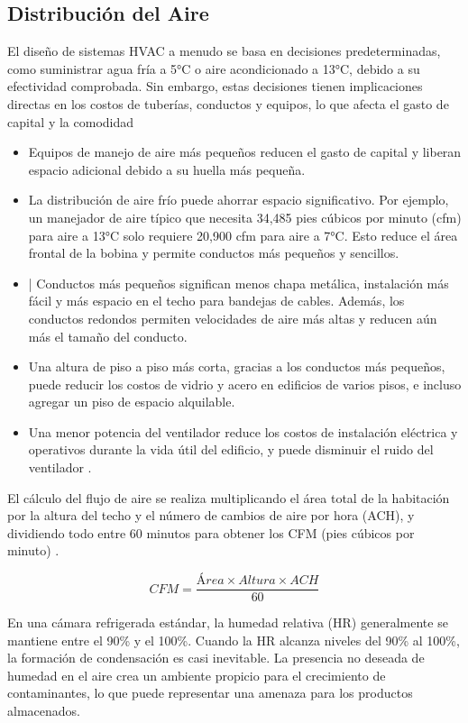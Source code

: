 \subsection{Distribución del Aire}
El diseño de sistemas HVAC a menudo se basa en decisiones predeterminadas, como suministrar agua fría a 5°C o aire acondicionado a 13°C, debido a su efectividad comprobada. Sin embargo, estas decisiones tienen implicaciones directas en los costos de tuberías, conductos y equipos, lo que afecta el gasto de capital y la comodidad \cite{hvac-2016}
\begin{itemize}
	\item Equipos de manejo de aire más pequeños reducen el gasto de capital y liberan espacio adicional debido a su huella más pequeña.
\item La distribución de aire frío puede ahorrar espacio significativo. Por ejemplo, un manejador de aire típico que necesita 34,485 pies cúbicos por minuto (cfm) para aire a 13°C solo requiere 20,900 cfm para aire a 7°C. Esto reduce el área frontal de la bobina y permite conductos más pequeños y sencillos.
\item| Conductos más pequeños significan menos chapa metálica, instalación más fácil y más espacio en el techo para bandejas de cables. Además, los conductos redondos permiten velocidades de aire más altas y reducen aún más el tamaño del conducto.
\item Una altura de piso a piso más corta, gracias a los conductos más pequeños, puede reducir los costos de vidrio y acero en edificios de varios pisos, e incluso agregar un piso de espacio alquilable.
\item Una menor potencia del ventilador reduce los costos de instalación eléctrica y operativos durante la vida útil del edificio, y puede disminuir el ruido del ventilador \cite{tecfrinor}.
\end{itemize}
El cálculo del flujo de aire se realiza multiplicando el área total de la habitación por la altura del techo y el número de cambios de aire por hora (ACH), y dividiendo todo entre 60 minutos para obtener los CFM (pies cúbicos por minuto) \cite{bercofred-2021}.

\begin{equation}
	 {CFM} = \frac{ {Área} \times  {Altura} \times  {ACH}}{60}
\end{equation}

En una cámara refrigerada estándar, la humedad relativa (HR) generalmente se mantiene entre el 90\% y el 100\%. Cuando la HR alcanza niveles del 90\% al 100\%, la formación de condensación es casi inevitable. La presencia no deseada de humedad en el aire crea un ambiente propicio para el crecimiento de contaminantes, lo que puede representar una amenaza para los productos almacenados.
